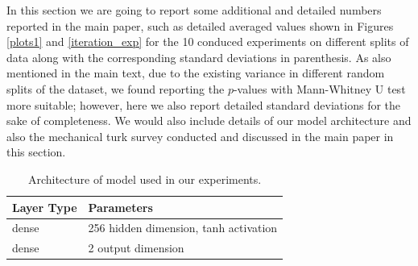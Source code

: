 
In this section we are going to report some additional and detailed numbers reported in the main paper, such as detailed averaged values shown in Figures \ref{plots1} and \ref{iteration_exp} for the 10 conduced experiments on different splits of data along with the corresponding standard deviations in parenthesis. As also mentioned in the main text, due to the existing variance in different random splits of the dataset, we found reporting the $p$-values with Mann-Whitney U test more suitable; however, here we also report detailed standard deviations for the sake of completeness. We would also include details of our model architecture and also the mechanical turk survey conducted and discussed in the main paper in this section.



\begin{table}[h]
\begin{tabular}{ p{1.4cm} p{5.4cm}}
 \toprule
 Layer Type&Parameters\\
 \midrule
 dense& 256 hidden dimension, tanh activation \\
 dense& 2 output dimension\\
  \bottomrule
\end{tabular}
\caption{Architecture of model used in our experiments.}
    \label{model}
\end{table}


